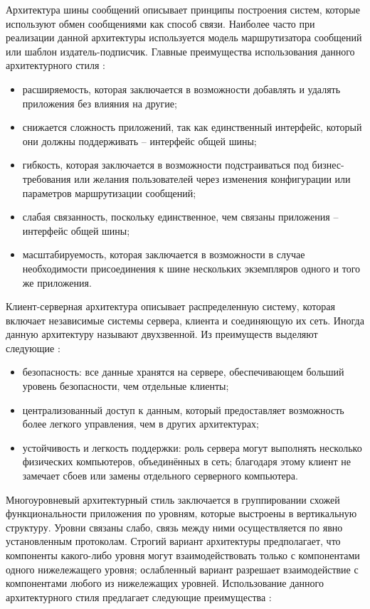 Архитектура шины сообщений описывает принципы построения систем, которые используют обмен сообщениями как
способ связи. Наиболее часто при реализации данной архитектуры используется модель маршрутизатора сообщений или
шаблон издатель-подписчик. Главные преимущества использования данного архитектурного стиля
\cite{application_architecture_guide}:

\begin{itemize}
	\item расширяемость, которая заключается в возможности добавлять и удалять приложения без влияния на другие;
	\item снижается сложность приложений, так как единственный интерфейс, который они должны поддерживать -- интерфейс общей шины;
	\item гибкость, которая заключается в возможности подстраиваться под биз\-нес-требования или желания пользователей через изменения конфигурации или параметров маршрутизации сообщений;
	\item слабая связанность, поскольку единственное, чем связаны приложения -- интерфейс общей шины;
	\item масштабируемость, которая заключается в возможности в случае необходимости присоединения к шине нескольких экземпляров одного и того же приложения.
\end{itemize}

Клиент-серверная архитектура описывает распределенную систему, которая включает независимые системы сервера,
клиента и соединяющую их сеть. Иногда данную архитектуру называют двухзвенной. Из преимуществ выделяют следующие \cite{architecture_volosevich}:

\begin{itemize}
	\item безопасность: все данные хранятся на сервере, обеспечивающем больший уровень безопасности, чем отдельные клиенты;
	\item централизованный доступ к данным, который предоставляет возможность более легкого управления, чем в других архитектурах;
	\item устойчивость и легкость поддержки: роль сервера могут выполнять несколько физических компьютеров, объединённых в сеть; благодаря этому клиент не замечает сбоев или замены отдельного серверного компьютера.
\end{itemize}

Многоуровневый архитектурный стиль заключается в группировании схожей функциональности приложения по уровням,
которые выстроены в вертикальную структуру. Уровни связаны слабо, связь между ними осуществляется по явно установленным
протоколам. Строгий вариант архитектуры предполагает, что компоненты какого-либо уровня могут взаимодействовать только
с компонентами одного нижележащего уровня; ослабленный вариант разрешает взаимодействие с компонентами любого из
нижележащих уровней. Использование данного архитектурного стиля предлагает следующие преимущества \cite{application_architecture_guide}:

